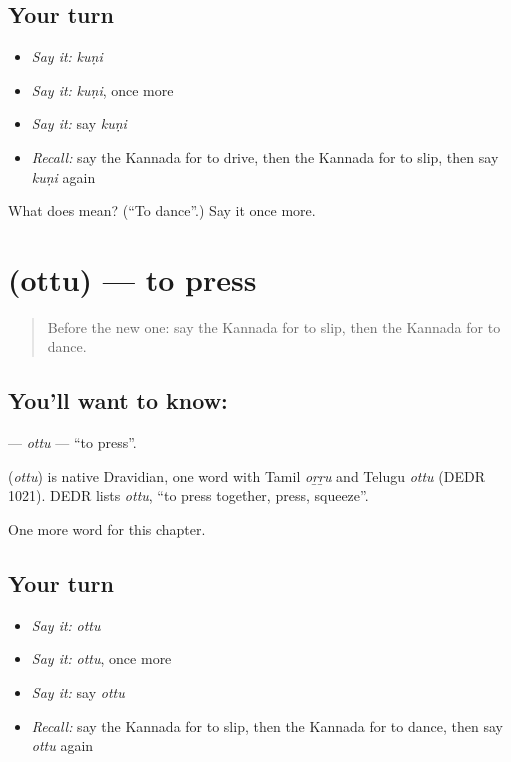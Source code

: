 \subsection*{Your turn}
\begin{itemize}
\raggedright
  \item \emph{Say it:} \emph{kuṇi}
  \item \emph{Say it:} \emph{kuṇi}, once more
  \item \emph{Say it:} say \emph{kuṇi}
  \item \emph{Recall:} say the Kannada for to drive, then the Kannada for to slip, then say \emph{kuṇi} again
\end{itemize}

\begin{tcolorbox}[breakable,colback=teal!4,colframe=teal!35!black,title={Before you move on}]
What does  mean? (\textquotedblleft{}To dance\textquotedblright{}.) Say it once more.
\end{tcolorbox}
\section[\texorpdfstring{\kn{ಒತ್ತು} (ottu)}{ಒತ್ತು (ottu)}]{ (ottu) — to press}

\label{lesson:KA-C274-ottu}



\begin{quote}
Before the new one: say the Kannada for to slip, then the Kannada for to dance.
\end{quote}

\subsection*{You'll want to know: }
\textbf{} — \emph{ottu} — \textquotedblleft{}to press\textquotedblright{}.

\begin{cousinweb}
\textbf{} (\emph{ottu}) is native Dravidian, one word with Tamil \emph{oṟṟu} and Telugu \emph{ottu} (DEDR 1021). DEDR lists \emph{ottu}, \textquotedblleft{}to press together, press, squeeze\textquotedblright{}.
\end{cousinweb}

\begin{grammarlens}[title={What you've built}]
One more word for this chapter.
\end{grammarlens}

\subsection*{Your turn}
\begin{itemize}
\raggedright
  \item \emph{Say it:} \emph{ottu}
  \item \emph{Say it:} \emph{ottu}, once more
  \item \emph{Say it:} say \emph{ottu}
  \item \emph{Recall:} say the Kannada for to slip, then the Kannada for to dance, then say \emph{ottu} again
\end{itemize}

